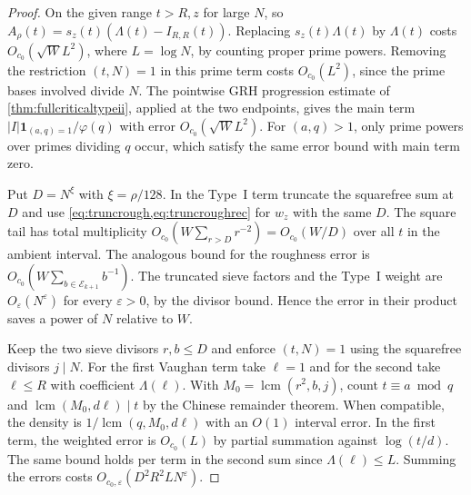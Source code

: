 \documentclass[11pt,a4paper]{article}
\numberwithin{equation}{section}
\begin{document}
\begin{proof}
On the given range $t>R,z$ for large $N$, so
$A_\rho(t)=s_z(t)(\Lambda(t)-I_{R,R}(t))$.
Replacing $s_z(t)\Lambda(t)$ by $\Lambda(t)$ costs
$O_{c_0}(\sqrt W L^2)$, where $L=\log N$, by counting
proper prime powers. Removing the restriction $(t,N)=1$
in this prime term costs $O_{c_0}(L^2)$, since the prime
bases involved divide $N$. The pointwise GRH progression
estimate of \cref{thm:fullcriticaltypeii}, applied at the
two endpoints, gives the main term
$|I|\mathbf1_{(a,q)=1}/\varphi(q)$ with error
$O_{c_0}(\sqrt W L^2)$. For $(a,q)>1$, only prime powers
over primes dividing $q$ occur, which satisfy the same
error bound with main term zero.

Put $D=N^\xi$ with $\xi=\rho/128$. In the Type~I term
truncate the squarefree sum at $D$ and use
\cref{eq:truncrough,eq:truncroughrec} for $w_z$ with
the same $D$. The square tail has total multiplicity
$O_{c_0}(W\sum_{r>D}r^{-2})=O_{c_0}(W/D)$ over all
$t$ in the ambient interval. The analogous bound for
the roughness error is $O_{c_0}(W\sum_{b\in\mathcal E_{k+1}}b^{-1})$.
The truncated sieve factors and the Type~I weight
are $O_\varepsilon(N^\varepsilon)$ for every
$\varepsilon>0$, by the divisor bound. Hence the error
in their product saves a power of $N$ relative to $W$.

Keep the two sieve divisors $r,b\le D$ and enforce
$(t,N)=1$ using the squarefree divisors $j\mid N$.
For the first Vaughan term take $\ell=1$ and for the
second take $\ell\le R$ with coefficient $\Lambda(\ell)$.
With $M_0=\operatorname{lcm}(r^2,b,j)$, count
$t\equiv a\bmod q$ and $\operatorname{lcm}(M_0,d\ell)\mid t$
by the Chinese remainder theorem. When compatible, the
density is $1/\operatorname{lcm}(q,M_0,d\ell)$ with
an $O(1)$ interval error. In the first term, the weighted
error is $O_{c_0}(L)$ by partial summation against
$\log(t/d)$. The same bound holds per term in the
second sum since $\Lambda(\ell)\le L$.
Summing the errors costs
$O_{c_0,\varepsilon}(D^2R^2 L N^\varepsilon)$.


\end{proof}
\end{document}
